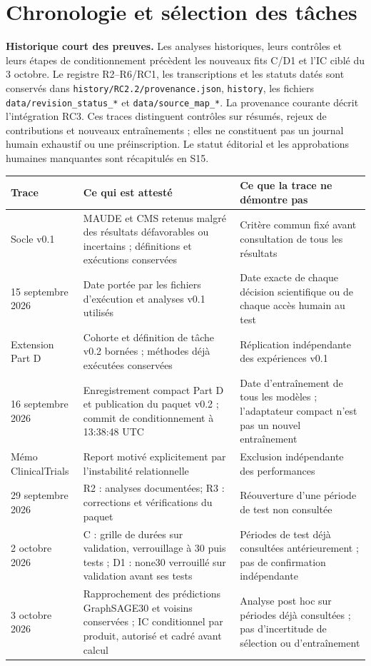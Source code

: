 \documentclass[10pt,a4paper]{article}
\newcommand{\src}[1]{{\small\nolinkurl{#1}}}
\begin{document}
\section{Chronologie et sélection des tâches}
\label{supp:chronology}
\textbf{Historique court des preuves.} Les analyses historiques, leurs contrôles et leurs étapes de conditionnement précèdent les nouveaux fits C/D1 et l'IC ciblé du 3 octobre. Le registre R2--R6/RC1, les transcriptions et les statuts datés sont conservés dans \src{history/RC2.2/provenance.json}, \src{history}, les fichiers \src{data/revision_status_*} et \src{data/source_map_*}. La provenance courante décrit l'intégration RC3. Ces traces distinguent contrôles sur résumés, rejeux de contributions et nouveaux entraînements ; elles ne constituent pas un journal humain exhaustif ou une préinscription. Le statut éditorial et les approbations humaines manquantes sont récapitulés en S15.
\begin{tabularx}{\linewidth}{@{}p{30mm}Xp{39mm}@{}}
\toprule
Trace & Ce qui est attesté & Ce que la trace ne démontre pas\\
\midrule
Socle v0.1 & MAUDE et CMS retenus malgré des résultats défavorables ou incertains ; définitions et exécutions conservées & Critère commun fixé avant consultation de tous les résultats\\
15 septembre 2026 & Date portée par les fichiers d'exécution et analyses v0.1 utilisés & Date exacte de chaque décision scientifique ou de chaque accès humain au test\\
Extension Part D & Cohorte et définition de tâche v0.2 bornées ; méthodes déjà exécutées conservées & Réplication indépendante des expériences v0.1\\
16 septembre 2026 & Enregistrement compact Part D et publication du paquet v0.2 ; commit de conditionnement à 13:38:48 UTC & Date d'entraînement de tous les modèles ; l'adaptateur compact n'est pas un nouvel entraînement\\
Mémo ClinicalTrials & Report motivé explicitement par l'instabilité relationnelle & Exclusion indépendante des performances\\
29 septembre 2026 & R2 : analyses documentées; R3 : corrections et vérifications du paquet & Réouverture d'une période de test non consultée\\
2 octobre 2026 & C : grille de durées sur validation, verrouillage à 30 puis tests ; D1 : none30 verrouillé sur validation avant ses tests & Périodes de test déjà consultées antérieurement ; pas de confirmation indépendante\\
3 octobre 2026 & Rapprochement des prédictions GraphSAGE30 et voisins conservées ; IC conditionnel par produit, autorisé et cadré avant calcul & Analyse post hoc sur périodes déjà consultées ; pas d'incertitude de sélection ou d'entraînement\\
\bottomrule
\end{tabularx}
\end{document}
